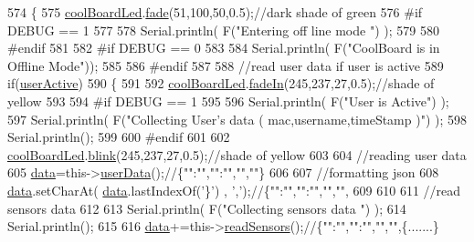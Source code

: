\begin{DoxyCode}
574 \{
575     \hyperlink{class_cool_board_a1b1d3c684a5baa56b08486e192fd8e97}{coolBoardLed}.\hyperlink{class_cool_board_led_af1cacbaa88db8bcf6042c1083ba41155}{fade}(51,100,50,0.5);\textcolor{comment}{//dark shade of green  }
576 \textcolor{preprocessor}{#if DEBUG == 1  }
577     
578     Serial.println( F(\textcolor{stringliteral}{"Entering off line mode "}) ); 
579     
580 \textcolor{preprocessor}{#endif}
581 
582 \textcolor{preprocessor}{#if DEBUG == 0}
583 
584     Serial.println( F(\textcolor{stringliteral}{"CoolBoard is in Offline Mode"}));
585 
586 \textcolor{preprocessor}{#endif}
587 
588     \textcolor{comment}{//read user data if user is active}
589     \textcolor{keywordflow}{if}(\hyperlink{class_cool_board_a6395459131d6889a3005f79c7a35e964}{userActive})
590     \{
591 
592         \hyperlink{class_cool_board_a1b1d3c684a5baa56b08486e192fd8e97}{coolBoardLed}.\hyperlink{class_cool_board_led_ab778f5e7bed0ab74e3906d82110493c3}{fadeIn}(245,237,27,0.5);\textcolor{comment}{//shade of yellow}
593 
594 \textcolor{preprocessor}{    #if DEBUG == 1}
595         
596         Serial.println( F(\textcolor{stringliteral}{"User is Active"}) );
597         Serial.println( F(\textcolor{stringliteral}{"Collecting User's data ( mac,username,timeStamp )"}) );
598         Serial.println();
599 
600 \textcolor{preprocessor}{    #endif}
601 
602         \hyperlink{class_cool_board_a1b1d3c684a5baa56b08486e192fd8e97}{coolBoardLed}.\hyperlink{class_cool_board_led_a96e1ea13003eee34c9dbcef340404426}{blink}(245,237,27,0.5);\textcolor{comment}{//shade of yellow   }
603 
604         \textcolor{comment}{//reading user data}
605         \hyperlink{class_cool_board_a427fb753dd8575bdf821c70a5c63d695}{data}=this->\hyperlink{class_cool_board_ae7358fb6e623cfc81b775f5f1734909b}{userData}();\textcolor{comment}{//\{"":"","":"","",""\}}
606 
607         \textcolor{comment}{//formatting json }
608         \hyperlink{class_cool_board_a427fb753dd8575bdf821c70a5c63d695}{data}.setCharAt( \hyperlink{class_cool_board_a427fb753dd8575bdf821c70a5c63d695}{data}.lastIndexOf(\textcolor{charliteral}{'\}'}) , \textcolor{charliteral}{','});\textcolor{comment}{//\{"":"","":"","","",}
609         
610                 
611         \textcolor{comment}{//read sensors data}
612 
613         Serial.println( F(\textcolor{stringliteral}{"Collecting sensors data "}) );
614         Serial.println();
615 
616         \hyperlink{class_cool_board_a427fb753dd8575bdf821c70a5c63d695}{data}+=this->\hyperlink{class_cool_board_ad03abdce2e65f520bbf2cff0f2d083cf}{readSensors}();\textcolor{comment}{//\{"":"","":"","","",\{.......\}}

\end{DoxyCode}
